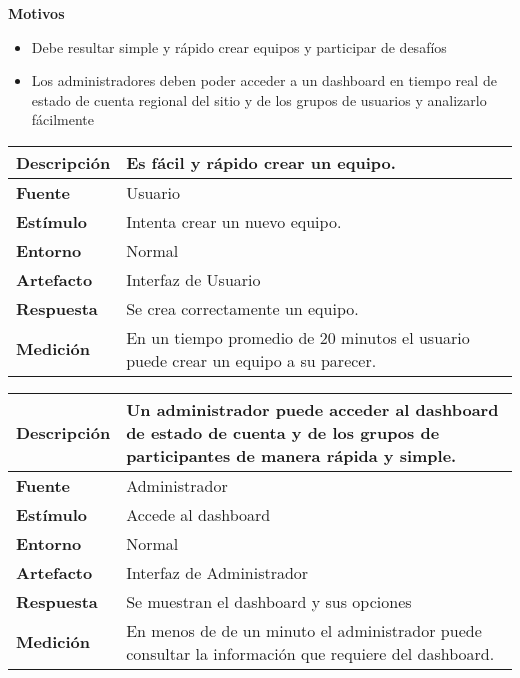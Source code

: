 \textbf{Motivos}
\begin{itemize}
\item{Debe resultar simple y rápido crear equipos y participar de desafíos}
\item{Los administradores deben poder acceder a un dashboard en tiempo real de estado de cuenta regional del sitio y de los grupos de usuarios y analizarlo fácilmente}
\end{itemize}


\begin{center}
  \begin{tabular}{| l | p{10cm} | }
    \hline
	\textbf{Descripción} & Es fácil y rápido crear un equipo.\\  \hline
	\textbf{Fuente} & Usuario\\  \hline
	\textbf{Estímulo} & Intenta crear un nuevo equipo.\\  \hline
	\textbf{Entorno} & Normal\\  \hline
	\textbf{Artefacto} & Interfaz de Usuario\\  \hline
	\textbf{Respuesta} & Se crea correctamente un equipo.\\  \hline
	\textbf{Medición} & En un tiempo promedio de 20 minutos el usuario puede crear un equipo a su parecer.\\  \hline
  \end{tabular}
\end{center}


\begin{center}
  \begin{tabular}{| l | p{10cm} | }
    \hline
	\textbf{Descripción} & Un administrador puede acceder al dashboard de estado de cuenta y de los grupos de participantes de manera rápida y simple.\\  \hline
	\textbf{Fuente} & Administrador\\  \hline
	\textbf{Estímulo} & Accede al dashboard\\  \hline
	\textbf{Entorno} & Normal\\  \hline
	\textbf{Artefacto} & Interfaz de Administrador\\  \hline
	\textbf{Respuesta} & Se muestran el dashboard y sus opciones\\  \hline
	\textbf{Medición} & En menos de de un minuto el administrador puede consultar la información que requiere del dashboard.\\  \hline
  \end{tabular}
\end{center}







